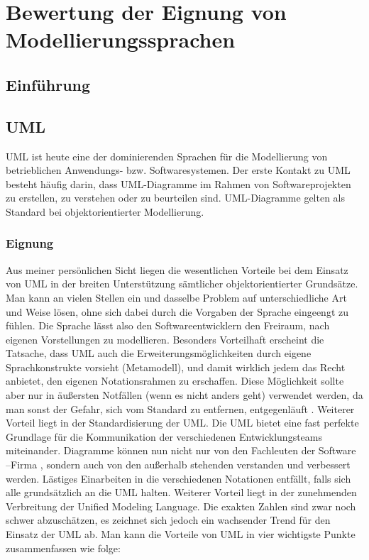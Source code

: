 

\chapter{Bewertung der Eignung von Modellierungssprachen}

\section{Einführung}
\section{UML}
UML ist heute eine der dominierenden Sprachen für die Modellierung von betrieblichen Anwendungs- bzw. Softwaresystemen. Der erste Kontakt zu UML besteht häufig darin, dass UML-Diagramme im Rahmen von Softwareprojekten zu erstellen, zu verstehen oder zu beurteilen sind. UML-Diagramme gelten als Standard bei objektorientierter Modellierung.
\subsection{Eignung}

Aus meiner persönlichen Sicht liegen die wesentlichen Vorteile bei dem Einsatz von UML in der breiten Unterstützung sämtlicher objektorientierter Grundsätze. Man kann an vielen Stellen ein und dasselbe Problem auf unterschiedliche Art und Weise lösen, ohne sich dabei durch die Vorgaben der Sprache eingeengt zu fühlen. Die Sprache lässt also den Softwareentwicklern den Freiraum, nach eigenen Vorstellungen zu modellieren. Besonders Vorteilhaft erscheint die Tatsache, dass UML auch die Erweiterungsmöglichkeiten durch eigene Sprachkonstrukte vorsieht (Metamodell), und damit wirklich jedem das Recht anbietet, den eigenen Notationsrahmen zu erschaffen. Diese Möglichkeit sollte aber nur in äußersten Notfällen (wenn es nicht anders geht) verwendet werden, da man sonst der Gefahr, sich vom Standard zu entfernen, entgegenläuft .
Weiterer Vorteil liegt in der Standardisierung der UML. Die  UML bietet eine fast perfekte Grundlage für die Kommunikation der verschiedenen Entwicklungsteams miteinander. Diagramme können nun nicht nur von den Fachleuten der Software –Firma , sondern auch von den außerhalb stehenden verstanden und verbessert werden. Lästiges  Einarbeiten in die verschiedenen Notationen entfällt, falls sich alle grundsätzlich an die UML halten. 
Weiterer Vorteil liegt in der zunehmenden Verbreitung der Unified Modeling Language. Die exakten Zahlen sind zwar noch schwer abzuschätzen, es zeichnet sich jedoch ein wachsender Trend für den Einsatz der UML ab.
Man kann die Vorteile von UML in vier wichtigste Punkte zusammenfassen wie folge:

